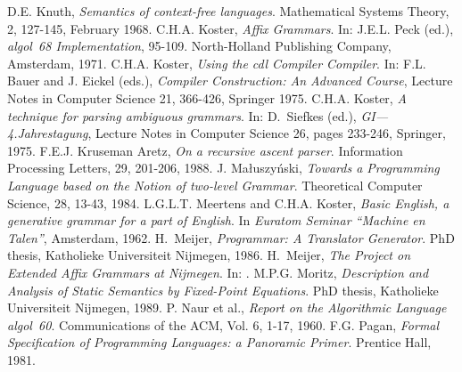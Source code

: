 \begin{thebibliography}{10}
D.E. Knuth,
{\em Semantics of context-free languages}.
Mathematical Systems Theory, 2, 127-145, February 1968.
\vspace{-2mm}
C.H.A. Koster,
{\em Affix Grammars}.
In: J.E.L. Peck (ed.), {\em {{\sc algol~68}} Implementation},
  95-109. North-Holland Publishing Company, Amsterdam, 1971.
\vspace{-2mm}
C.H.A. Koster,
{\em Using the {{\sc cdl}} Compiler Compiler}.
In: F.L. Bauer and J. Eickel (eds.),
{\em Compiler Construction: An Advanced Course},
Lecture Notes in Computer Science 21, 366-426, Springer 1975.
\vspace{-2mm}
C.H.A. Koster,
{\em A technique for parsing ambiguous grammars}.
In: D.~Siefkes (ed.), {\em {GI}---4.Jahrestagung},
Lecture Notes in Computer Science 26, pages 233-246, Springer, 1975.
\vspace{-2mm}
F.E.J. Kruseman Aretz,
{\em On a recursive ascent parser}.
Information Processing Letters, 29, 201-206, 1988.
\vspace{-2mm}
J. Ma{\l}uszy\'nski,
{\em Towards a Programming Language based on the Notion of two-level Grammar}.
Theoretical Computer Science, 28, 13-43, 1984.
\vspace{-2mm}
L.G.L.T. Meertens and C.H.A. Koster,
{\em Basic English, a generative grammar for a part of English}.
In {\em Euratom Seminar ``Machine en Talen''}, Amsterdam, 1962.
\vspace{-2mm}
H.~Meijer,
{\em Programmar: A Translator Generator}.
PhD thesis, Katholieke Universiteit Nijmegen, 1986.
\vspace{-2mm}
H.~Meijer,
{\em The Project on Extended Affix Grammars at Nijmegen}.
In: \cite{waga}.
\vspace{-2mm}
M.P.G. Moritz,
{\em Description and Analysis of Static Semantics by Fixed-Point
  Equations}.
PhD thesis, Katholieke Universiteit Nijmegen, 1989.
\vspace{-2mm}
P. Naur et al.,
{\em Report on the Algorithmic Language {{\sc algol~60}}}.
Communications of the ACM, Vol. 6, 1-17, 1960.
\vspace{-2mm}
F.G. Pagan,
{\em Formal Specification of Programming Languages: a Panoramic Primer}.
Prentice Hall, 1981.
\vspace{-2mm}

\end{thebibliography}

